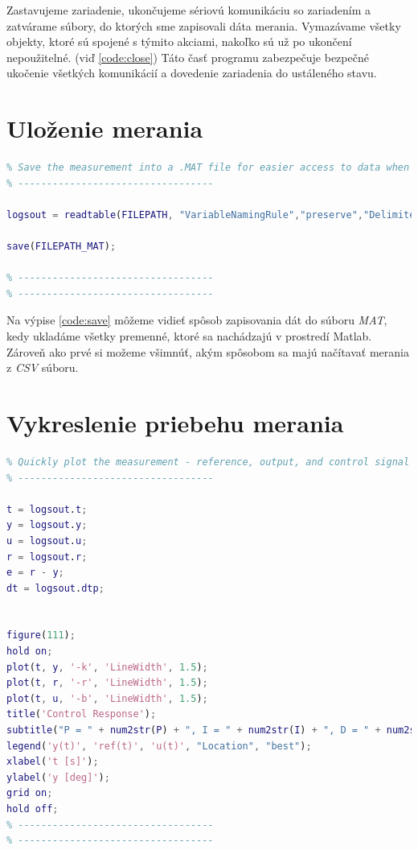 \documentclass[a4paper, 10pt, ]{article}
\begin{document}
Zastavujeme zariadenie, ukončujeme sériovú komunikáciu so zariadením a zatvárame súbory, do ktorých sme zapisovali dáta merania. Vymazávame všetky objekty, ktoré sú spojené s týmito akciami, nakoľko sú už po ukončení nepoužitelné. (viď \ref{code:close}) Táto časť programu zabezpečuje bezpečné ukočenie všetkých komunikácií a dovedenie zariadenia do ustáleného stavu.

\section{Uloženie merania}
\begin{lstlisting}[caption=Ukladanie meracích dát do csv a mat súborov., label={code:save}, language=Matlab]
% ----------------------------------
% Save the measurement into a .MAT file for easier access to data when using Matlab
% ----------------------------------

logsout = readtable(FILEPATH, "VariableNamingRule","preserve","Delimiter",",");

save(FILEPATH_MAT);

% ----------------------------------
% ----------------------------------
\end{lstlisting}

Na výpise \ref{code:save} môžeme vidieť spôsob zapisovania dát do súboru \emph{MAT}, kedy ukladáme všetky premenné, ktoré sa nachádzajú v prostredí Matlab. Zároveň ako prvé si možeme všimnúť, akým spôsobom sa majú načítavať merania z \emph{CSV} súboru.

\section{Vykreslenie priebehu merania}
\begin{lstlisting}[caption=Vykreslenie základných veličín procesu merania., label={code:plot_basic}, language=Matlab]
% ----------------------------------
% Quickly plot the measurement - reference, output, and control signal
% ----------------------------------

t = logsout.t;
y = logsout.y;
u = logsout.u;
r = logsout.r;
e = r - y;
dt = logsout.dtp;


figure(111);
hold on;
plot(t, y, '-k', 'LineWidth', 1.5);
plot(t, r, '-r', 'LineWidth', 1.5);
plot(t, u, '-b', 'LineWidth', 1.5);
title('Control Response');
subtitle("P = " + num2str(P) + ", I = " + num2str(I) + ", D = " + num2str(D));
legend('y(t)', 'ref(t)', 'u(t)', "Location", "best");
xlabel('t [s]');
ylabel('y [deg]');
grid on;
hold off;
% ----------------------------------
% ----------------------------------
\end{lstlisting}
\end{document}
